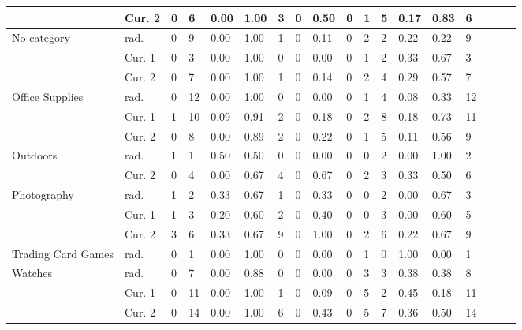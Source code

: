\begin{tabular}{p{2cm}|l|l|l|l|l|l|l|l|l|l|l|l|l|l|l|l|l}
            & Cur. 2 &         0 &   6 &   0.00 &   1.00 &       3 &  0 &   0.50 &    0 &      1 &   5 &   0.17 &   0.83 &   6 \\
    \hline
    No category 
            & rad. &         0 &   9 &   0.00 &   1.00 &       1 &  0 &   0.11 &    0 &      2 &   2 &   0.22 &   0.22 &   9 \\
            & Cur. 1 &         0 &   3 &   0.00 &   1.00 &       0 &  0 &   0.00 &    0 &      1 &   2 &   0.33 &   0.67 &   3 \\
            & Cur. 2 &         0 &   7 &   0.00 &   1.00 &       1 &  0 &   0.14 &    0 &      2 &   4 &   0.29 &   0.57 &   7 \\
    \hline
    Office Supplies 
            & rad. &         0 &  12 &   0.00 &   1.00 &      0 &  0 &   0.00 &    0 &     1 &   4 &   0.08 &   0.33 &  12 \\
            & Cur. 1 &         1 &  10 &   0.09 &   0.91 &      2 &  0 &   0.18 &    0 &     2 &   8 &   0.18 &   0.73 &  11 \\
            & Cur. 2 &         0 &   8 &   0.00 &   0.89 &      2 &  0 &   0.22 &    0 &     1 &   5 &   0.11 &   0.56 &   9 \\
    \hline
    Outdoors 
            & rad. &         1 &   1 &   0.50 &   0.50 &       0 &  0 &   0.00 &    0 &        0 &   2 &   0.00 &   1.00 &   2 \\
            & Cur. 2 &         0 &   4 &   0.00 &   0.67 &       4 &  0 &   0.67 &    0 &        2 &   3 &   0.33 &   0.50 &   6 \\
    \hline
    Photography 
            & rad. &         1 &   2 &   0.33 &   0.67 &       1 &  0 &   0.33 &    0 &       0 &   2 &   0.00 &   0.67 &   3 \\
            & Cur. 1 &         1 &   3 &   0.20 &   0.60 &       2 &  0 &   0.40 &    0 &       0 &   3 &   0.00 &   0.60 &   5 \\
            & Cur. 2 &         3 &   6 &   0.33 &   0.67 &       9 &  0 &   1.00 &    0 &       2 &   6 &   0.22 &   0.67 &   9 \\
    \hline
    Trading Card Games & rad. &         0 &   1 &   0.00 &   1.00 &        0 &  0 &   0.00 &    0 &        1 &   0 &   1.00 &   0.00 &   1 \\
    \hline
    Watches 
            & rad. &         0 &   7 &   0.00 &   0.88 &      0 &  0 &   0.00 &    0 &      3 &   3 &   0.38 &   0.38 &   8 \\
            & Cur. 1 &         0 &  11 &   0.00 &   1.00 &      1 &  0 &   0.09 &    0 &      5 &   2 &   0.45 &   0.18 &  11 \\
            & Cur. 2 &         0 &  14 &   0.00 &   1.00 &      6 &  0 &   0.43 &    0 &      5 &   7 &   0.36 &   0.50 &  14 \\
    
    \end{tabular}
